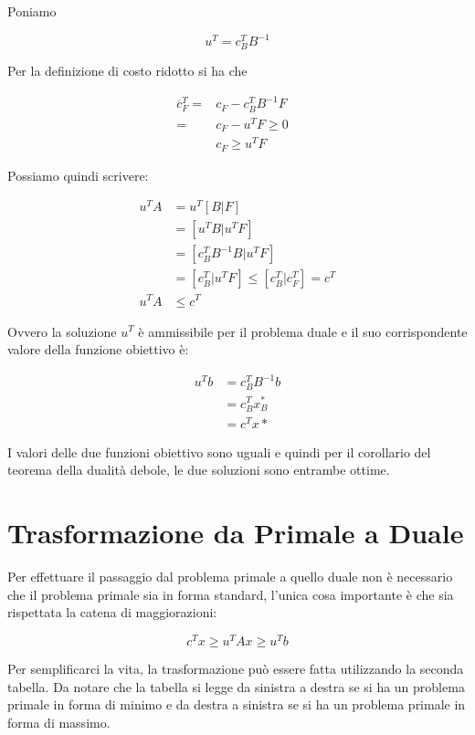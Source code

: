 Poniamo

$$
u^T = c_{B}^TB^{-1}
$$

Per la definizione di costo ridotto si ha che

\begin{align*}
\overline{c}_{F}^T = &c_F - c_{B}^TB^{-1}F & \\
				   = &c_F - u^T F \geq 0 \\
					  &c_F \geq u^T F	                
\end{align*}

Possiamo quindi scrivere:

\begin{align*}
	u^T A &= u^T[B|F] \\
	      &= [u^TB |u^T F] \\
	      &= [c_{B}^TB^{-1} B |u^T F] \\
	      &= [c_{B}^T |u^T F] \leq [c_{B}^T | c_{F}^T] = c^T \\
    u^T A &\leq c^T
\end{align*}

Ovvero la soluzione $u^T$ è ammissibile per il problema duale e il suo corrispondente valore della funzione obiettivo è:

\begin{align*}
	u^T b &= c_{B}^T B^{-1} b \\
	      &= c_{B}^T x_{B}^* \\
	      &= c^Tx*
\end{align*}

I valori delle due funzioni obiettivo sono uguali e quindi per il corollario del teorema della dualità debole, le due soluzioni sono entrambe ottime.

\section{Trasformazione da Primale a Duale}

Per effettuare il passaggio dal problema primale a quello duale non è necessario che il problema primale sia in forma standard, l'unica cosa importante è che sia rispettata la catena di maggiorazioni:

$$
c^T x \geq u^T Ax \geq u^Tb
$$

\noindent Per semplificarci la vita, la trasformazione può essere fatta utilizzando la seconda tabella. Da notare che la tabella si legge da sinistra a destra se si ha un problema primale in forma di minimo e da destra a sinistra se si ha un problema primale in forma di massimo.

